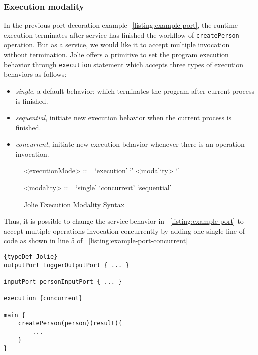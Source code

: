 \subsubsection{Execution modality}

In the previous port decoration example ~\ref{listing:example-port}, the runtime execution terminates after service has finished the workflow of \texttt{createPerson} operation. But as a service, we would like it to accept multiple invocation without termination.
Jolie offers a primitive to set the program execution behavior through \texttt{execution} statement which accepts three types of execution behaviors as follows:

\begin{itemize}
    \item \textit{single}, a default behavior; which terminates the program after current process is finished.
    \item \textit{sequential}, initiate new execution behavior when the current process is finished.
    \item \textit{concurrent}, initiate new execution behavior whenever there is an operation invocation.
\end{itemize}

\begin{figure}[ht]
    \begin{framed}
        \begin{grammar}
            <executionMode>
            ::= `execution' `{' <modality> `}'

            <modality>
            ::= `single'
            \alt `concurrent'
            \alt `sequential'
        \end{grammar}
    \end{framed}
    \caption{Jolie Execution Modality Syntax}
\end{figure}

Thus, it is possible to change the service behavior in ~\ref{listing:example-port} to accept multiple operations invocation concurrently by adding one single line of code as shown in line 5 of ~\ref{listing:example-port-concurrent}

\begin{listing}[ht]

    \lstset{language=Jolie,
        style=codeStyle,
        numbers=left,
        firstnumber=1
    }
    \begin{lstlisting}[frame=tlrb]{typeDef-Jolie}
outputPort LoggerOutputPort { ... }

inputPort personInputPort { ... }

execution {concurrent}

main {
    createPerson(person)(result){
        ...
    }
}
\end{lstlisting}
    \caption{Jolie concurrent service example}
    \label{listing:example-port-concurrent}
\end{listing}

\FloatBarrier